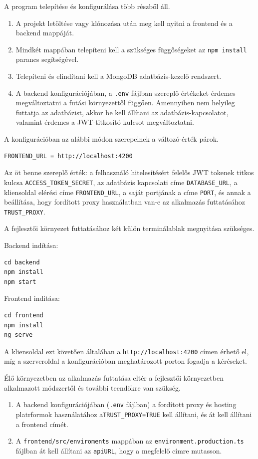 \label{sec:install}

A program telepítése és konfigurálása több részből áll.
\begin{enumerate}
\item A projekt letöltése vagy klónozása után meg kell nyitni a frontend és a backend mappáját.
\item Mindkét mappában telepíteni kell a szükséges függőségeket az \texttt{npm install} parancs segítségével.
\item Telepíteni és elindítani kell a MongoDB adatbázis-kezelő rendszert.
\item A backend konfigurációjában, a \texttt{.env} fájlban szereplő értékeket érdemes megváltoztatni a futási környezettől függően. Amennyiben nem helyileg futtatja az adatbázist, akkor be kell állítani az adatbázis-kapcsolatot, valamint érdemes a JWT-titkosító kulcsot megváltoztatni. 
\end{enumerate}

A konfigurációban az alábbi módon szerepelnek a változó-érték párok.
\begin{verbatim} 
FRONTEND_URL = http://localhost:4200
\end{verbatim}
Az öt benne szereplő érték: a felhasználó hitelesítésért felelős JWT tokenek titkos kulcsa \texttt{ACCESS\_TOKEN\_SECRET}, az adatbázis kapcsolati címe \texttt{DATABASE\_URL}, a kliensoldal elérési címe \texttt{FRONTEND\_URL}, a saját portjának a címe \texttt{PORT}, és annak a beállítása, hogy fordított proxy használatban van-e az alkalmazás futtatásához \texttt{TRUST\_PROXY}.

A fejlesztői környezet futtatásához két külön terminálablak megnyitása szükséges.

Backend indítása:
\begin{verbatim}
cd backend
npm install
npm start
\end{verbatim}

Frontend inditása:
\begin{verbatim}
cd frontend
npm install
ng serve
\end{verbatim}

A kliensoldal ezt követően általában a \texttt{http://localhost:4200} címen érhető el, míg a szerveroldal a konfigurációban meghatározott porton fogadja a kéréseket.

Élő környezetben az alkalmazás futtatása eltér a fejlesztői környezetben alkalmazott módszertől és további teendőkre van szükség.
\begin{enumerate}
\item A backend konfigurációjában (\texttt{.env} fájlban) a fordított proxy és hosting platrformok használatához a\texttt{TRUST\_PROXY=TRUE} kell állítani, és át kell állítani a frontend címét.
\item A \texttt{frontend/src/enviroments} mappában az \texttt{environment.production.ts} fájlban át kell állítani az \texttt{apiURL}, hogy a megfelelő címre mutasson.
\end{enumerate}

